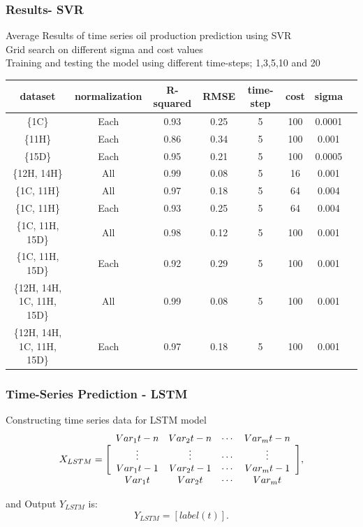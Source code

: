 \documentclass[xcolor=table]{beamer}
\begin{document}
\begin{frame}
\frametitle{Results- SVR}
 \begin{block}{}
Average Results of time series oil production prediction using SVR\\
Grid search on different sigma and cost values\\
Training and testing the model using different time-steps; 1,3,5,10 and 20
\end{block}

 \begin{table}[H]
 \begin{adjustbox}{width=0.9\linewidth,center}
 
 		\begin{tabular}{cccccccc}
 			\toprule
 			\multicolumn{1}{c}{dataset}&\multicolumn{1}{c}{normalization}&\multicolumn{1}{c}{R-squared}&\multicolumn{1}{c}{RMSE}&\multicolumn{1}{c}{time-step}&\multicolumn{1}{c}{cost}&\multicolumn{1}{c}{sigma}\tabularnewline
 			\midrule
 			\{1C\} & Each & 0.93 & 0.25 & 5 &100 & 0.0001\tabularnewline
 			\{11H\} & Each & 0.86 & 0.34 & 5 &100 & 0.001\tabularnewline
 			\{15D\} & Each &  0.95& 0.21 & 5 &100 & 0.0005\tabularnewline
 			\{12H, 14H\}& All &\cellcolor{green!40}0.99 & 0.08 & 5 &16 & 0.001\tabularnewline
 			\{1C, 11H\} & All & 0.97 & 0.18 & 5 &64 & 0.004\tabularnewline
 			\{1C, 11H\} & Each & 0.93 & 0.25 & 5 &64 & 0.004\tabularnewline
 			\{1C, 11H, 15D\}  & All &\cellcolor{green!40} 0.98 & 0.12 & 5 &100 & 0.001\tabularnewline
 			\{1C, 11H, 15D\}  & Each & 0.92 & 0.29 & 5 &100 & 0.001\tabularnewline
 			\{12H, 14H, 1C, 11H, 15D\}  & All &\cellcolor{green!40} 0.99 & 0.08 & 5 &100 & 0.001\tabularnewline
 			\{12H, 14H, 1C, 11H, 15D\}  & Each & 0.97 & 0.18 & 5 &100 & 0.001\tabularnewline
 			\bottomrule
 	\end{tabular}
	\end{adjustbox}
 \end{table}
 
\end{frame}

\begin{frame}
\frametitle{Time-Series Prediction - LSTM}

\begin{block}{Constructing time series data for LSTM model}
\begin{equation}
X_{LSTM} =	\Bigg[\begin{array}{c c c c}
Var_1{t-n} & Var_2{t-n} & \cdots & Var_m{t-n}\\
\vdots & \vdots & \cdots & \vdots \\
Var_1{t-1} & Var_2{t-1} & \cdots & Var_m{t-1}\\
Var_1{t} & Var_2{t}& \cdots & Var_m{t}\\
\end{array}\Bigg],
\end{equation}

and Output $Y_{LSTM}$ is:
\begin{equation}
Y_{LSTM} = [label(t)].	
\end{equation}

\end{block}

\end{frame}
\end{document}
